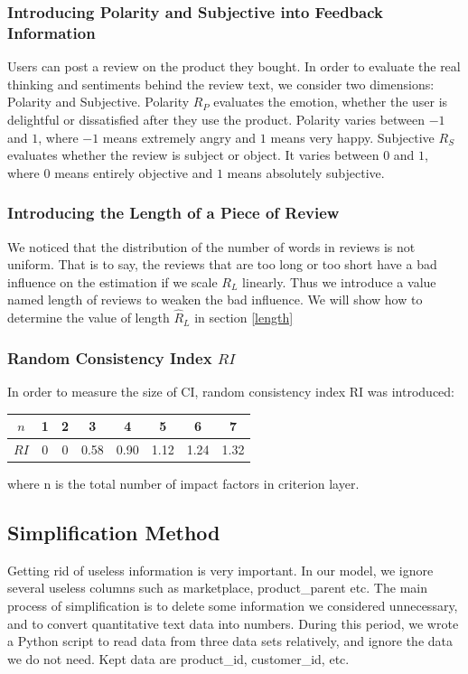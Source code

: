 \documentclass{mcmthesis}
\begin{document}
\subsubsection{Introducing Polarity and Subjective into Feedback Information}

    Users can post a review on the product they bought. In order to evaluate the real thinking and sentiments behind the review text, we consider two dimensions: Polarity and Subjective. Polarity $R_P$ evaluates the emotion, whether the user is delightful or dissatisfied after they use the product. Polarity varies between $-1$ and $1$, where $-1$ means extremely angry and $1$ means very happy. Subjective $R_S$ evaluates whether the review is subject or object. It varies between $0$ and $1$, where $0$ means entirely objective and $1$ means absolutely subjective.
    
\subsubsection{Introducing the Length of a Piece of Review}
    We noticed that the distribution of the number of words in reviews is not uniform. That is to say, the reviews that are too long or too short have a bad influence on the estimation if we scale $R_L$ linearly. Thus we introduce a value named length of reviews to weaken the bad influence. We will show how to determine the value of length $\widehat R_L$ in section \ref{length}
    
    
    
\subsubsection{Random Consistency Index $RI$}
In order to measure the size of CI, random consistency index RI was introduced:

\begin{center}
    \begin{tabular}{|c|c|c|c|c|c|c|c|}
         \hline
         $n$ & 1 & 2 & 3 & 4 & 5 & 6 & 7 \\
         \hline
         $RI$& 0 & 0 & 0.58 & 0.90 & 1.12 & 1.24 & 1.32\\
         \hline
    \end{tabular}
\end{center}
where n is the total number of impact factors in criterion layer.

\subsection{Simplification Method}
    Getting rid of useless information is very important. In our model, we ignore several useless columns such as marketplace, product\_parent etc. 
    The main process of simplification is to delete some information we considered unnecessary, and to convert quantitative text data into numbers. During this period, we wrote a Python script to read data from three data sets relatively, and ignore the data we do not need. Kept data are product\_id, customer\_id, etc.
    
\end{document}
